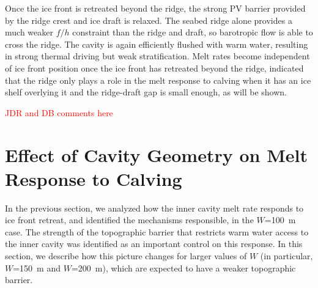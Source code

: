 \documentclass[draft]{agujournal2019}
\newcommand{\red}[1]{\textcolor{red}{#1}}
\begin{document}
Once the ice front is retreated beyond the ridge, the strong PV barrier provided by the ridge crest and ice draft is relaxed. The seabed ridge alone provides a much weaker $f/h$ constraint than the ridge and draft, so barotropic flow is able to cross the ridge. The cavity is again efficiently flushed with warm water, resulting in strong thermal driving but weak stratification. Melt rates become independent of ice front position once the ice front has retreated beyond the ridge, indicated that the ridge only plays a role in the melt response to calving when it has an ice shelf overlying it and the ridge-draft gap is small enough, as will be shown.

\red{JDR and DB comments here}
\section{Effect of Cavity Geometry on Melt Response to Calving}\label{S:Results:H}
In the previous section, we analyzed how the inner cavity melt rate responds to ice front retreat, and identified the mechanisms responsible, in the $W$=100~m case. The strength of the topographic barrier that restricts warm water access to the inner cavity was identified as an important control on this response. In this section, we describe how this picture changes for larger values of $W$ (in particular, $W$=150~m and $W$=200~m), which are expected to have a weaker topographic barrier.

\end{document}
